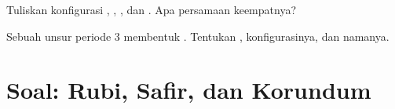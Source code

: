 \begin{exercise}[$\star\star\star$]\label{exo:g10:electron-shells:14}
Tuliskan konfigurasi , , , dan .
Apa persamaan keempatnya?
\end{exercise}

\begin{exercise}[$\star\star\star$]\label{exo:g10:electron-shells:15}
Sebuah unsur periode 3 membentuk  . Tentukan ,
konfigurasinya, dan namanya.
\end{exercise}

\section{Soal: Rubi, Safir, dan Korundum}

